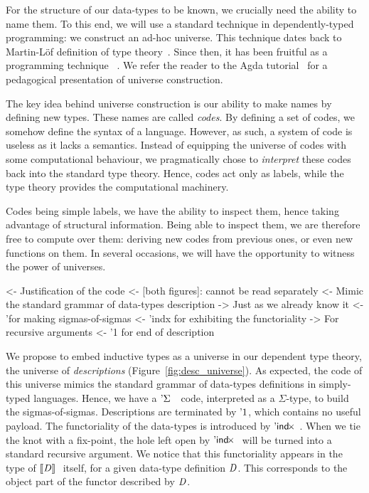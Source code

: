 For the structure of our data-types to be known, we crucially need the
ability to name them.  To this
end, we will use a standard technique in dependently-typed programming: we
construct an ad-hoc universe. This technique dates back to Martin-L\"of
definition of type theory~\cite{martin-lof:itt}. Since then, it has been
fruitful as a programming 
technique~\cite{benke:universe-generic-prog,whoelse?}
. 
We refer the reader to the Agda tutorial~\cite{norell:agda-tutorial} for a
pedagogical presentation of universe construction. 


The key idea behind universe construction is our ability to make names
by defining new types. These names are called \emph{codes}. By
defining a set of codes, we somehow define the syntax of a
language. However, as such, a system of code is useless as it lacks a
semantics. Instead of equipping the universe of codes with some
computational behaviour, we pragmatically chose to \emph{interpret}
these codes back into the standard type theory. Hence, codes act only
as labels, while the type theory provides the computational
machinery. 

Codes being simple labels, we have the ability to inspect them, hence
taking advantage of structural information. Being able to inspect
them, we are therefore free to compute over them: deriving new codes
from previous ones, or even new functions on them. In several
occasions, we will have the opportunity to witness the power of
universes.

\begin{wstructure}
<- Justification of the code 
    <- [both figures]: cannot be read separately
    <- Mimic the standard grammar of data-types description
        -> Just as we already know it
        <- '\Sigma for making sigmas-of-sigmas
        <- 'indx for exhibiting the functoriality
            -> For recursive arguments
        <- '1 for end of description
\end{wstructure}

We propose to embed inductive types as a universe in our dependent
type theory, the universe of \emph{descriptions}
(Figure~\ref{fig:desc_universe}). As expected, the code of this
universe mimics the standard grammar of data-types definitions in
simply-typed languages. Hence, we have a $\DSigma{}{}$ code,
interpreted as a $\Sigma$-type, to build the
sigmas-of-sigmas. Descriptions are terminated by $\DUnit$, which
contains no useful payload. The functoriality of the data-types is
introduced by $\DIndx$. When we tie the knot with a fix-point, the
hole left open by $\DIndx$ will be turned into a standard recursive
argument. We notice that this functoriality appears in the type of
$\descop{\V{D}}{}$ itself, for a given data-type definition $\V{D}$. This
corresponds to the object part of the functor described by $\V{D}$.

